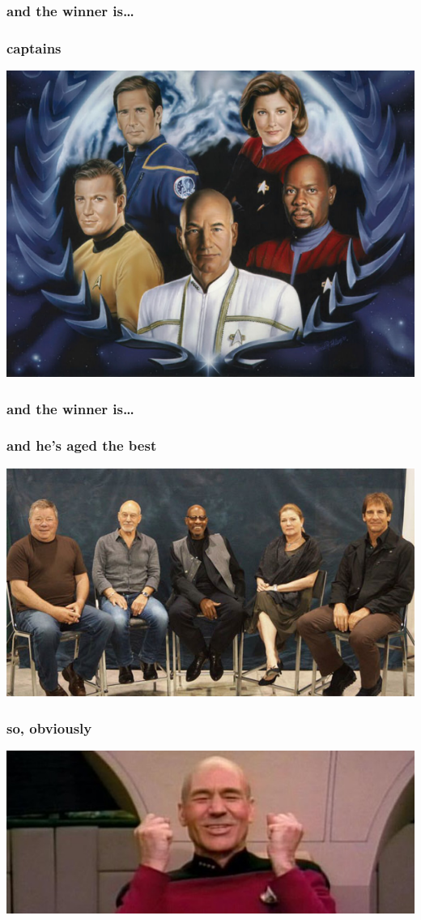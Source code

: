 \documentclass{beamer}
\begin{document}
\begin{frame}
  \frametitle{and the winner is\ldots}
  
\end{frame}

\begin{frame}
  \frametitle{captains}
  \includegraphics[height = 0.8\textheight, keepaspectratio = true]{figure/Star-Trek-Captains}
\end{frame}

\begin{frame}
  \frametitle{and the winner is\ldots}
  
\end{frame}

\begin{frame}
  \frametitle{and he's aged the best}
  \includegraphics[width = \textwidth, height = 0.8\textheight, keepaspectratio = true]{figure/AllTheCaptains}
\end{frame}

\begin{frame}
  \frametitle{so, obviously}
  \includegraphics[width = \textwidth, keepaspectratio = true]{figure/win}
\end{frame}
\end{document}
